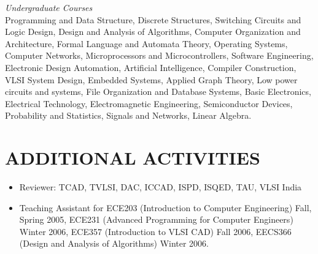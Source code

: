 \documentclass[margin]{res}
\begin{document}
\begin{resume}
{\sl Undergraduate Courses} \hfill \\
Programming and Data Structure, Discrete Structures, Switching Circuits and 
Logic Design, Design and Analysis of Algorithms, Computer Organization and Architecture, 
Formal Language and Automata Theory, Operating Systems, Computer Networks, Microprocessors 
and Microcontrollers, Software Engineering, Electronic Design Automation, Artificial 
Intelligence, Compiler Construction, VLSI System Design, Embedded Systems, Applied Graph 
Theory, Low power circuits and systems, File Organization and Database Systems, Basic Electronics,
Electrical Technology, Electromagnetic Engineering, Semiconductor Devices, Probability and 
Statistics, Signals and Networks, Linear Algebra.

\section{ADDITIONAL ACTIVITIES}
\begin{itemize} \itemsep -2pt
\item Reviewer: TCAD, TVLSI, DAC, ICCAD, ISPD, ISQED, TAU, VLSI India
\item Teaching Assistant for ECE203 (Introduction to Computer Engineering) Fall, Spring 2005, 
  ECE231 (Advanced Programming for Computer Engineers) Winter 2006, ECE357 (Introduction 
  to VLSI CAD) Fall 2006, EECS366 (Design and Analysis of Algorithms) Winter 2006.
\end{itemize}


\end{resume}
\end{document}
